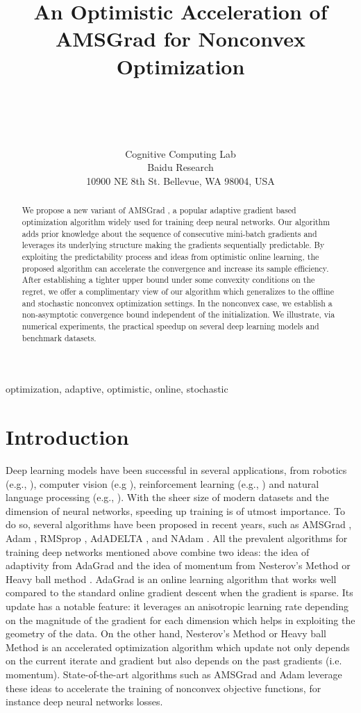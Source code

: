 \documentclass[wcp]{jmlr}
\title[OPT-AMS for Nonconvex Optimization]{An Optimistic Acceleration of AMSGrad for Nonconvex Optimization}
\author{\Name{Jun-Kun Wang} \Email{wangjim123@gmail.com}\\
  \Name{Xiaoyun Li} \Email{xiaoyunli@gmail.com}\\
  \Name{Belhal Karimi} \Email{belhal.karimi@gmail.com}\\
   \Name{Ping Li} \Email{liping11@gmail.com}\\
  \addr Cognitive Computing Lab\\
Baidu Research\\
10900 NE 8th St. Bellevue, WA 98004, USA}
\begin{document}
\maketitle

\begin{abstract}
We propose a new variant of AMSGrad \citep{RKK18}, a popular adaptive gradient based optimization algorithm widely used for training deep neural networks. 
Our algorithm adds prior knowledge about the sequence of consecutive mini-batch gradients and leverages its underlying structure making the gradients sequentially predictable. 
By exploiting the predictability process and ideas from optimistic online learning, the proposed algorithm can accelerate the convergence and increase its sample efficiency.
After establishing a tighter upper bound under some convexity conditions on the regret, we offer a complimentary view of our algorithm which generalizes to the offline and stochastic nonconvex optimization settings. 
In the nonconvex case, we establish a non-asymptotic convergence bound independent of the initialization.
We illustrate, via numerical experiments, the practical speedup on several deep learning models and benchmark datasets.

\end{abstract}
\begin{keywords}
optimization, adaptive, optimistic, online, stochastic
\end{keywords}

\section{Introduction}


Deep learning models have been successful in several applications, from robotics (e.g., \citep{LFDA17}), computer vision (e.g \citep{Rnet16,goodfellow2014generative}), reinforcement learning (e.g., \citep{Atari13}) and natural language processing (e.g., \citep{GMH13}).
With the sheer size of modern datasets and the dimension of neural networks, speeding up training is of utmost importance.
To do so, several algorithms have been proposed in recent years, such as  AMSGrad \citep{RKK18}, Adam \citep{KB15}, RMSprop \citep{TH12}, AdADELTA \citep{Z12}, and NAdam \citep{D16}.
All the prevalent algorithms for training deep networks mentioned above combine two ideas: the idea of adaptivity from AdaGrad \citep{DHS11,MS10} and the idea of momentum from Nesterov's Method \citep{N04} or Heavy ball method \citep{P64}.
AdaGrad is an online learning algorithm that works well compared to the standard online gradient descent when the gradient is sparse.
Its update has a notable feature: it leverages an anisotropic learning rate depending on the magnitude of the gradient for each dimension which helps in exploiting the geometry of the data. 
On the other hand, Nesterov's Method or Heavy ball Method \citep{P64} is an accelerated optimization algorithm which update not only depends on the current iterate and gradient but also depends on the past gradients (i.e. momentum). 
State-of-the-art algorithms such as AMSGrad \citep{RKK18} and Adam \citep{KB15} leverage these ideas to accelerate the training of nonconvex objective functions, for instance deep neural networks losses.
\end{document}
